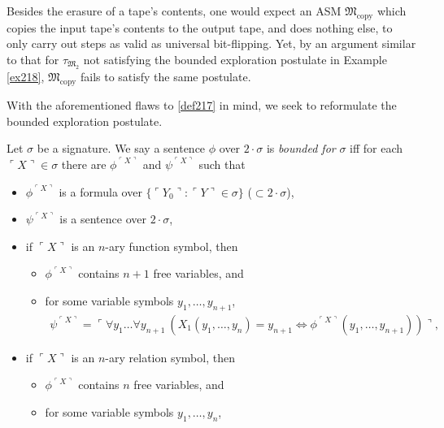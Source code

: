 \documentclass[12pt]{article}
\numberwithin{equation}{section}
\begin{document}
Besides the erasure of a tape's contents, one would expect an ASM $\mathfrak{M}_{\text{copy}}$ which copies the input tape's contents to the output tape, and does nothing else, to only carry out steps as valid as universal bit-flipping. Yet, by an argument similar to that for $\tau_{\mathfrak{M}_2}$ not satisfying the bounded exploration postulate in Example \ref{ex218}, $\mathfrak{M}_{\text{copy}}$ fails to satisfy the same postulate. 

With the aforementioned flaws to \ref{def217} in mind, we seek to reformulate the bounded exploration postulate.

\begin{defi}\label{def220}
Let $\sigma$ be a signature. We say a sentence $\phi$ over $2 \cdot \sigma$ is \emph{bounded for} $\sigma$ iff for each $\ulcorner X \urcorner \in \sigma$ there are $\phi^{\ulcorner X \urcorner}$ and $\psi^{\ulcorner X \urcorner}$ such that
\begin{itemize}
    \item $\phi^{\ulcorner X \urcorner}$ is a formula over $\{\ulcorner Y_0 \urcorner : \ulcorner Y \urcorner \in \sigma\}$ ($\subset 2 \cdot \sigma$),
    \item $\psi^{\ulcorner X \urcorner}$ is a sentence over $2 \cdot \sigma$,
    \item if $\ulcorner X \urcorner$ is an $n$-ary function symbol, then 
    \begin{itemize}[label=$\circ$, leftmargin=20pt]
        \item $\phi^{\ulcorner X \urcorner}$ contains $n + 1$ free variables, and
        \item for some variable symbols $y_1, \dots, y_{n+1}$,
        \begin{align*}
            \psi^{\ulcorner X \urcorner} = \ulcorner \forall y_1 \dots \forall y_{n+1} \ (X_1(y_1, \dots, y_n) = y_{n+1} \iff \phi^{\ulcorner X \urcorner}(y_1, \dots, y_{n+1})) \urcorner \text{,}
        \end{align*}
    \end{itemize}
    \item if $\ulcorner X \urcorner$ is an $n$-ary relation symbol, then 
    \begin{itemize}[label=$\circ$, leftmargin=20pt]
        \item $\phi^{\ulcorner X \urcorner}$ contains $n$ free variables, and
        \item for some variable symbols $y_1, \dots, y_n$,
        \begin{align*}

\end{align*}
\end{itemize}
\end{itemize}
\end{defi}
\end{document}
